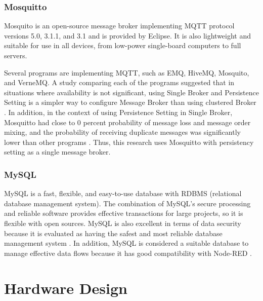 \documentclass[conference]{IEEEtran}
\begin{document}
\subsubsection{Mosquitto}
Mosquito is an open-source message broker implementing MQTT protocol versions 5.0, 3.1.1, and 3.1 and is provided by Eclipse. It is also lightweight and suitable for use in all devices, from low-power single-board computers to full servers.\cite{b22}

Several programs are implementing MQTT, such as EMQ, HiveMQ, Mosquito, and VerneMQ. A study comparing each of the programs suggested that in situations where availability is not significant, using Single Broker and Persistence Setting is a simpler way to configure Message Broker than using clustered Broker \cite{b23}. In addition, in the context of using Persistence Setting in Single Broker, Mosquitto had close to 0 percent probability of message loss and message order mixing, and the probability of receiving duplicate messages was significantly lower than other programs \cite{b23}. Thus, this research uses Mosquitto with persistency setting as a single message broker.

\subsubsection{MySQL}
MySQL is a fast, flexible, and easy-to-use database with RDBMS (relational database management system). The combination of MySQL's secure processing and reliable software provides effective transactions for large projects, so it is flexible with open sources. MySQL is also excellent in terms of data security because it is evaluated as having the safest and most reliable database management system \cite{b24}. In addition, MySQL is considered a suitable database to manage effective data flows because it has good compatibility with Node-RED \cite{b24}.

\section{Hardware Design}
\end{document}
